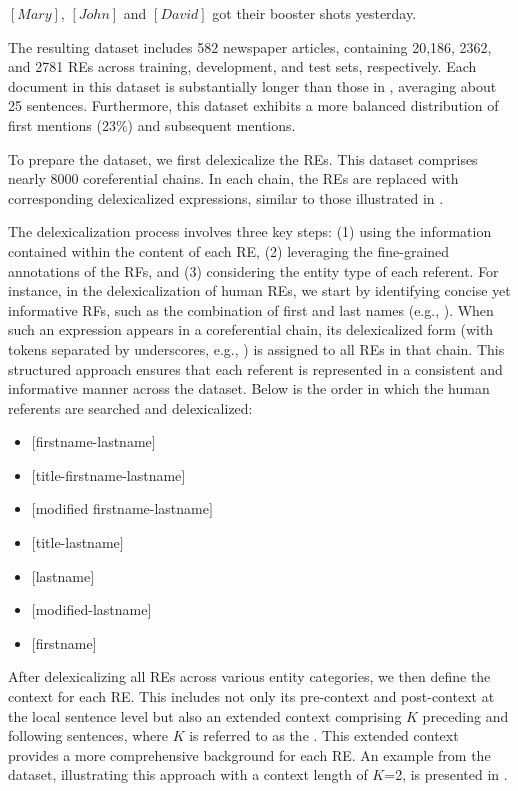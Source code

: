 \begin{exe}
	\ex\label{ex:booster} $[Mary]$, $[John]$ and $[David]$ got their booster shots yesterday.
\end{exe}

The resulting \wsj dataset includes 582 newspaper articles, containing 20,186, 2362, and 2781 REs across training, development, and test sets, respectively. Each document in this dataset is substantially longer than those in \webnlg, averaging about 25 sentences. Furthermore, this dataset exhibits a more balanced distribution of first mentions (23\%) and subsequent mentions.

To prepare the dataset, we first delexicalize the REs. This dataset comprises nearly 8000 coreferential chains. In each chain, the REs are replaced with corresponding delexicalized expressions, similar to those illustrated in . 

The delexicalization process involves three key steps: (1) using the information contained within the content of each RE, (2) leveraging the fine-grained annotations of the RFs, and (3) considering the entity type of each referent. For instance, in the delexicalization of human REs, we start by identifying concise yet informative RFs, such as the combination of first and last names (e.g., ). When such an expression appears in a coreferential chain, its delexicalized form (with tokens separated by underscores, e.g., ) is assigned to all REs in that chain. This structured approach ensures that each referent is represented in a consistent and informative manner across the dataset. Below is the order in which the human referents are searched and delexicalized:

\begin{itemize}
	\setlength{\itemsep}{-0.5em} 
	\renewcommand{\labelitemi}{--}
	\item $[$firstname-lastname$]$
	\item $[$title-firstname-lastname$]$
	\item $[$modified firstname-lastname$]$
	\item $[$title-lastname$]$
	\item $[$lastname$]$
	\item $[$modified-lastname$]$
	\item $[$firstname$]$
\end{itemize}


After delexicalizing all REs across various entity categories, we then define the context for each RE. This includes not only its pre-context and post-context at the local sentence level but also an extended context comprising $K$ preceding and following sentences, where $K$ is referred to as the . This extended context provides a more comprehensive background for each RE. An example from the \wsj dataset, illustrating this approach with a context length of $K$=2, is presented in .

